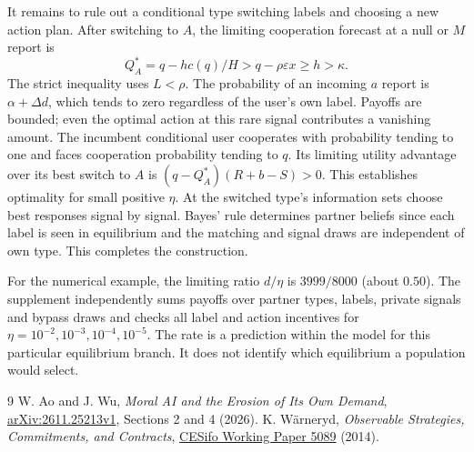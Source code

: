 \documentclass[11pt]{article}
\begin{document}
It remains to rule out a conditional type switching labels and choosing a new action plan. After switching to $A$, the limiting cooperation forecast at a null or $M$ report is
\[
         Q_A^*=q-h c(q)/H > q-\rho\varepsilon x\ge h>\kappa.
\]
The strict inequality uses $L<\rho$. The probability of an incoming $a$ report is $\alpha+\Delta d$, which tends to zero regardless of the user's own label. Payoffs are bounded; even the optimal action at this rare signal contributes a vanishing amount. The incumbent conditional user cooperates with probability tending to one and faces cooperation probability tending to $q$. Its limiting utility advantage over its best switch to $A$ is $(q-Q_A^*)(R+b-S)>0$. This establishes optimality for small positive $\eta$. At the switched type's information sets choose best responses signal by signal. Bayes' rule determines partner beliefs since each label is seen in equilibrium and the matching and signal draws are independent of own type. This completes the construction.

For the numerical example, the limiting ratio $d/\eta$ is $3999/8000$ (about $0.50$). The supplement independently sums payoffs over partner types, labels, private signals and bypass draws and checks all label and action incentives for $\eta=10^{-2},10^{-3},10^{-4},10^{-5}$. The rate is a prediction within the model for this particular equilibrium branch. It does not identify which equilibrium a population would select.


\small
\begin{thebibliography}{9}
 W. Ao and J. Wu, \emph{Moral AI and the Erosion of Its Own Demand}, \href{https://arxiv.org/abs/2611.25213v1}{arXiv:2611.25213v1}, Sections 2 and 4 (2026).
 K. W\"arneryd, \emph{Observable Strategies, Commitments, and Contracts}, \href{https://www.ifo.de/DocDL/cesifo1_wp5089.pdf}{CESifo Working Paper 5089} (2014).
\end{thebibliography}
\end{document}
